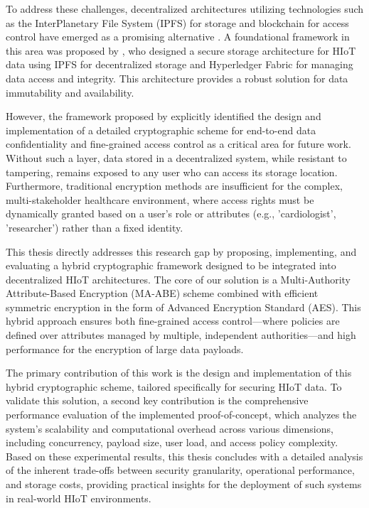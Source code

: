 \documentclass[cic,tc,english]{iiufrgs}
\numberwithin{algorithm}{chapter}
\begin{document}
    To address these challenges, decentralized architectures utilizing technologies such as the InterPlanetary File System (IPFS) for storage and blockchain for access control have emerged as a promising alternative \cite{benet2013ipfs, fabric}. A foundational framework in this area was proposed by \citet{laura2023}, who designed a secure storage architecture for HIoT data using IPFS for decentralized storage and Hyperledger Fabric for managing data access and integrity. This architecture provides a robust solution for data immutability and availability.

    However, the framework proposed by \citet{laura2023} explicitly identified the design and implementation of a detailed cryptographic scheme for end-to-end data confidentiality and fine-grained access control as a critical area for future work. Without such a layer, data stored in a decentralized system, while resistant to tampering, remains exposed to any user who can access its storage location. Furthermore, traditional encryption methods are insufficient for the complex, multi-stakeholder healthcare environment, where access rights must be dynamically granted based on a user's role or attributes (e.g., 'cardiologist', 'researcher') rather than a fixed identity.

    This thesis directly addresses this research gap by proposing, implementing, and evaluating a hybrid cryptographic framework designed to be integrated into decentralized HIoT architectures. The core of our solution is a Multi-Authority Attribute-Based Encryption (MA-ABE) scheme combined with efficient symmetric encryption in the form of Advanced Encryption Standard (AES). This hybrid approach ensures both fine-grained access control—where policies are defined over attributes managed by multiple, independent authorities—and high performance for the encryption of large data payloads.

    The primary contribution of this work is the design and implementation of this hybrid cryptographic scheme, tailored specifically for securing HIoT data. To validate this solution, a second key contribution is the comprehensive performance evaluation of the implemented proof-of-concept, which analyzes the system's scalability and computational overhead across various dimensions, including concurrency, payload size, user load, and access policy complexity. Based on these experimental results, this thesis concludes with a detailed analysis of the inherent trade-offs between security granularity, operational performance, and storage costs, providing practical insights for the deployment of such systems in real-world HIoT environments.
\end{document}
